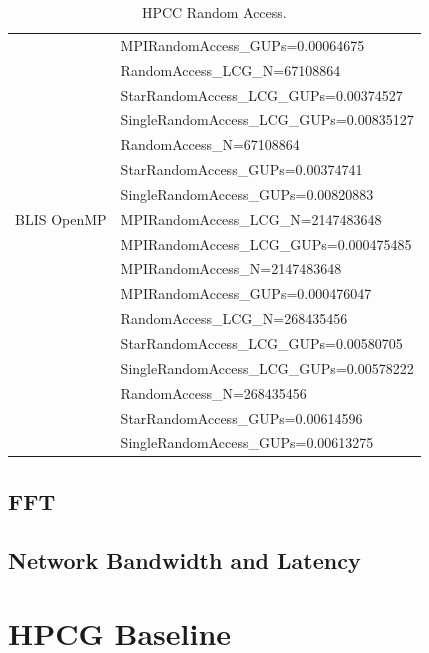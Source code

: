 \documentclass{report}
\begin{document}
\begin{table}[H]
\begin{center}
\begin{tabular}{ |l|l| }
                & MPIRandomAccess\_GUPs=0.00064675 \\
                \cline{2-2} 
                & RandomAccess\_LCG\_N=67108864 \\
                & StarRandomAccess\_LCG\_GUPs=0.00374527 \\
                & SingleRandomAccess\_LCG\_GUPs=0.00835127 \\
                \cline{2-2} 
                & RandomAccess\_N=67108864 \\
                & StarRandomAccess\_GUPs=0.00374741 \\
                & SingleRandomAccess\_GUPs=0.00820883 \\
\hline
BLIS OpenMP     & MPIRandomAccess\_LCG\_N=2147483648 \\
                & MPIRandomAccess\_LCG\_GUPs=0.000475485 \\
                \cline{2-2} 
                & MPIRandomAccess\_N=2147483648 \\
                & MPIRandomAccess\_GUPs=0.000476047 \\
                \cline{2-2} 
                & RandomAccess\_LCG\_N=268435456 \\
                & StarRandomAccess\_LCG\_GUPs=0.00580705 \\
                & SingleRandomAccess\_LCG\_GUPs=0.00578222 \\
                \cline{2-2} 
                & RandomAccess\_N=268435456 \\
                & StarRandomAccess\_GUPs=0.00614596 \\
                & SingleRandomAccess\_GUPs=0.00613275 \\
\hline
\end{tabular}
\end{center}
\caption{\label{tab:table-name}HPCC Random Access.}
\end{table}


%
%
\subsection{FFT}


%
%
\subsection{Network Bandwidth and Latency}



%
%
\section{HPCG Baseline}
\end{document}
